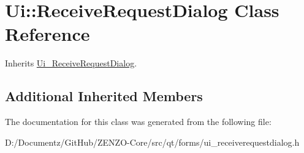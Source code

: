 \hypertarget{class_ui_1_1_receive_request_dialog}{}\section{Ui\+::Receive\+Request\+Dialog Class Reference}
\label{class_ui_1_1_receive_request_dialog}


Inherits \mbox{\hyperlink{class_ui___receive_request_dialog}{Ui\+\_\+\+Receive\+Request\+Dialog}}.

\subsection*{Additional Inherited Members}


The documentation for this class was generated from the following file\+:\begin{DoxyCompactItemize}
\item 
D\+:/\+Documentz/\+Git\+Hub/\+Z\+E\+N\+Z\+O-\/\+Core/src/qt/forms/ui\+\_\+receiverequestdialog.\+h\end{DoxyCompactItemize}
